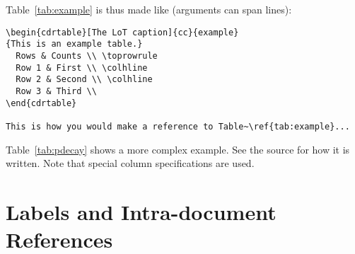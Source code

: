 \noindent Table~\ref{tab:example} is thus made like (arguments can span lines):

\begin{verbatim}
\begin{cdrtable}[The LoT caption]{cc}{example}
{This is an example table.}
  Rows & Counts \\ \toprowrule
  Row 1 & First \\ \colhline
  Row 2 & Second \\ \colhline
  Row 3 & Third \\ 
\end{cdrtable}

This is how you would make a reference to Table~\ref{tab:example}... 
\end{verbatim}

Table~\ref{tab:pdecay} shows a more complex example.
See the source for how it is written.
Note that special column specifications are used.


\FloatBarrier



\section{Labels and Intra-document References}
\label{sec:intra-doc-ref}

